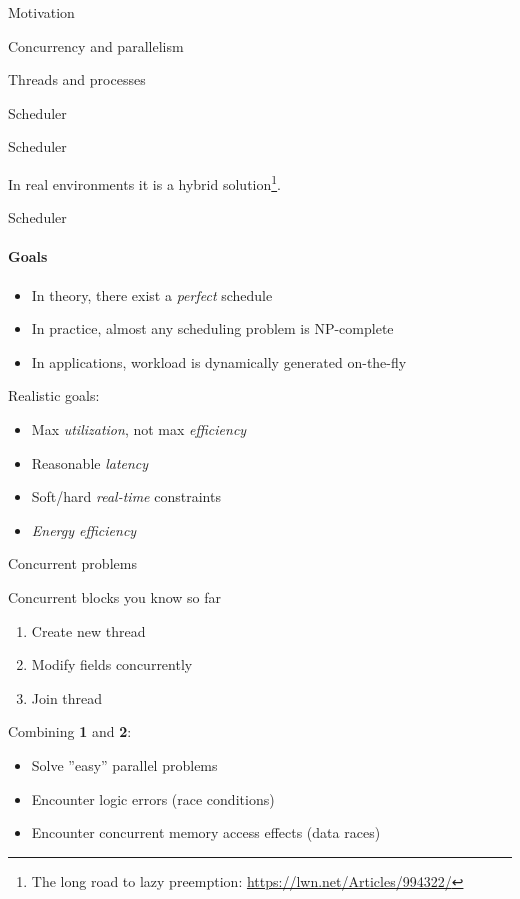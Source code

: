 \begin{section}{Motivation}
\begin{section}{Concurrency and parallelism}
\begin{section}{Threads and processes}
\begin{section}{Scheduler}
\begin{frame}{Scheduler}
\pause

In real environments it is  a hybrid solution\footnote<2->{The long road to lazy preemption: \url{https://lwn.net/Articles/994322/}}.

\end{frame}

\begin{frame}{Scheduler}
\framesubtitle{Goals}

\begin{itemize}
    \item In theory, there exist a \textit{perfect} schedule
    \item In practice, almost any scheduling problem is NP-complete
    \item In applications, workload is dynamically generated on-the-fly
\end{itemize}

\pause

Realistic goals:
\begin{itemize}
    \item Max \textit{utilization}, not max \textit{efficiency}
    \item Reasonable \textit{latency}
    \item Soft/hard \textit{real-time} constraints
    \item \textit{Energy efficiency}
\end{itemize}
\end{frame}


\begin{section}{Concurrent problems}
\showTOC


\begin{frame}{Concurrent blocks you know so far}

\begin{enumerate}
    \item Create new thread
    \item Modify fields concurrently
    \item Join thread
\end{enumerate}

\pause 
Combining \textbf{1} and \textbf{2}:
\begin{itemize}
    \item Solve ''easy'' parallel problems
    \item Encounter logic errors (race conditions)
    \item Encounter concurrent memory access effects (data races)
\end{itemize}


\end{frame}
\end{section}
\end{section}
\end{section}
\end{section}
\end{section}
